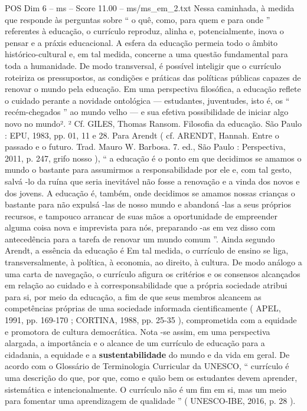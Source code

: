 \begin{textsample}{POS Dim 6 – ms – Score 11.00 – ms/ms\_em\_2.txt}
Nessa caminhada, à medida que responde às perguntas sobre “ o quê, como, para quem e para onde ” referentes à educação, o currículo reproduz, alinha e, potencialmente, inova o pensar e a práxis educacional.
A esfera da educação permeia todo o âmbito histórico-cultural e, em tal medida, concerne a uma questão fundamental para toda a humanidade.
De modo transversal, é possível inteligir que o currículo roteiriza os pressupostos, as condições e práticas das políticas públicas capazes de renovar o mundo pela educação.
Em uma perspectiva filosófica, a educação reflete o cuidado perante a novidade ontológica — estudantes, juventudes, isto é, os “ recém-chegados ” ao mundo velho — e sua efetiva possibilidade de iniciar algo novo no mundo². ² Cf.
GILES, Thomas Ransom.
Filosofia da educação.
São Paulo : EPU, 1983, pp. 01, 11 e 28.
Para Arendt ( cf.
ARENDT, Hannah.
Entre o passado e o futuro.
Trad.
Mauro W.
Barbosa. 7. ed., São Paulo : Perspectiva, 2011, p. 247, grifo nosso ), “ a educação é o ponto em que decidimos se amamos o mundo o bastante para assumirmos a responsabilidade por ele e, com tal gesto, salvá -lo da ruína que seria inevitável não fosse a renovação e a vinda dos novos e dos jovens.
A educação é, também, onde decidimos se amamos nossas crianças o bastante para não expulsá -las de nosso mundo e abandoná -las a seus próprios recursos, e tampouco arrancar de suas mãos a oportunidade de empreender alguma coisa nova e imprevista para nós, preparando -as em vez disso com antecedência para a tarefa de renovar um mundo comum ”.
Ainda segundo Arendt, a essência da educação é Em tal medida, o currículo de ensino se liga, transversalmente, à política, à economia, ao direito, à cultura.
De modo análogo a uma carta de navegação, o currículo afigura os critérios e os consensos alcançados em relação ao cuidado e à corresponsabilidade que a própria sociedade atribui para si, por meio da educação, a fim de que seus membros alcancem as competências próprias de uma sociedade informada cientificamente ( APEL, 1991, pp. 169-170 ; CORTINA, 1988, pp. 25-35 ), comprometida com a equidade e promotora de cultura democrática.
Nota -se assim, em uma perspectiva alargada, a importância e o alcance de um currículo de educação para a cidadania, a equidade e a \textbf{sustentabilidade} do mundo e da vida em geral.
De acordo com o Glossário de Terminologia Curricular da UNESCO, “ currículo é uma descrição do que, por que, como e quão bem os estudantes devem aprender, sistemática e intencionalmente.
O currículo não é um fim em si, mas um meio para fomentar uma aprendizagem de qualidade ” ( UNESCO-IBE, 2016, p. 28 ).

\end{textsample}
